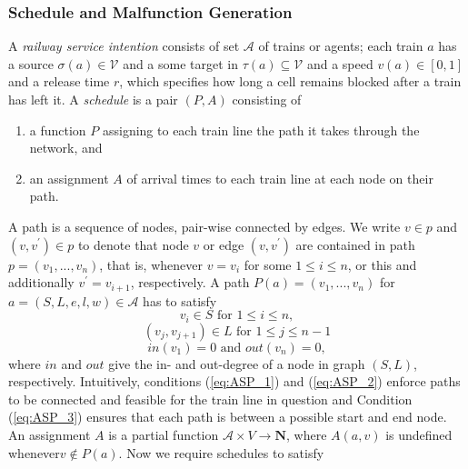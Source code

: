 \documentclass{article}
\begin{document}
\subsubsection{Schedule and Malfunction Generation}\label{subsubsec:scheduleandmalfunctiongeneration}


A \emph{railway service intention} consists of set $\mathcal{A}$ of trains or agents; each train $a$ has a source $\sigma(a)\in\mathcal{V}$ and a some target in $\tau(a)\subseteq\mathcal{V}$ and a speed $v(a) \in [0,1]$ and a release time $r$, which specifies how long a cell remains blocked after a train has left it.
%
A \emph{schedule} is a pair $(P, A)$ consisting of
\begin{enumerate}
    \item a function $P$ assigning to each train line the path it takes through the network, and
    \item an assignment $A$ of arrival times to each train line at each node on their path.
\end{enumerate}
A path is a sequence of nodes, pair-wise connected by edges. We write $v\in p$ and $(v, v^\prime)\in p$ to denote that node $v$ or edge $(v, v^\prime)$ are contained in path $p=(v_1, . . . , v_n)$, that is, whenever $v=v_i$ for some $1\leq i \leq n$, or this and additionally $v^\prime=v_{i+1}$, respectively.
%
A path $P(a) = (v_1, . . . , v_n)$ for $a= (S, L, e, l, w)\in \mathcal{A}$ has to satisfy
\begin{equation}
v_i \in S \textrm{ for }1\leq i \leq n \label{eq:ASP_1},
\end{equation}
\begin{equation}
(v_j, v_{j+1})\in L \textrm{ for } 1\leq j \leq n-1 \label{eq:ASP_2}
\end{equation}
\begin{equation}
in(v_1) = 0 \textrm{ and } out(v_n) = 0,\label{eq:ASP_3}
\end{equation}
where $in$ and $out$ give the in- and out-degree of a node in graph $(S, L)$, respectively.
Intuitively, conditions (\ref{eq:ASP_1}) and (\ref{eq:ASP_2}) enforce paths to be connected and feasible for the train line in question and Condition (\ref{eq:ASP_3}) ensures that each path is between a possible start and end node.
An assignment $A$ is a partial function $\mathcal{A}\times V\to \mathbf{N}$, where $A(a, v)$ is undefined whenever$v\not\in P(a)$.
%
Now we require schedules to satisfy
\end{document}
